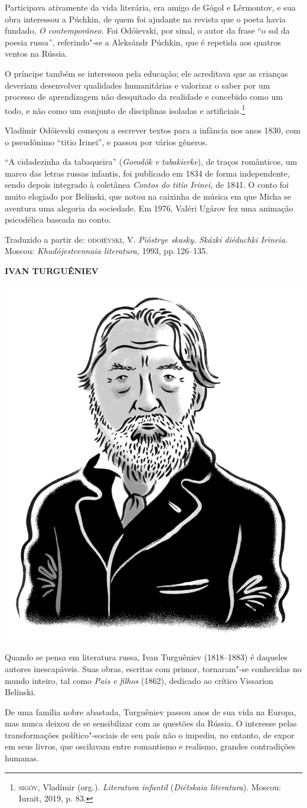 Participava ativamente da vida literária, era amigo de Gógol e
Lêrmontov, e sua obra interessou a Púchkin, de quem foi ajudante na
revista que o poeta havia fundado, \emph{O contemporâneo.} Foi
Odóievski, por sinal, o autor da frase ``o sol da poesia russa'',
referindo"-se a Aleksándr Púchkin, que é repetida aos quatros ventos na
Rússia.

O príncipe também se interessou pela educação; ele acreditava que as
crianças deveriam desenvolver qualidades humanitárias e valorizar o
saber por um processo de aprendizagem não desquitado da realidade e
concebido como um todo, e não como um conjunto de disciplinas isoladas e
artificiais.\footnote{\scriptsize\textsc{sigóv}, Vladímir (org.). \textit{Literatura infantil} (\textit{Diétskaia literatura}). Moscou: Iurait, 2019, p. 83.}

Vladímir Odóievski começou a escrever textos para a infância nos anos
1830, com o pseudônimo ``titio Irinei'', e passou por vários gêneros.

``A cidadezinha da tabaqueira'' (\emph{Gorodók v tabakierke}), de traços
românticos, um marco das letras russas infantis, foi publicado em 1834
de forma independente, sendo depois integrado à coletânea \emph{Contos
do titio Irinei,} de 1841. O conto foi muito elogiado por
Belínski, que notou na caixinha de música em que Micha se
aventura uma alegoria da sociedade. Em 1976, Valéri Ugárov fez uma
animação psicodélica baseada no conto. 

Traduzido a partir de: \textsc{odoiévski}, V. \emph{Pióstrye skasky. Skázki diéduchki Irineia.} Moscou:
\emph{Khudójestvennaia literatura,} 1993, pp.\,126--135.

\bigskip
\noindent\textbf{IVAN TURGUÊNIEV}\medskip

\noindent\includegraphics[width=.8in]{./imgs/autor3.jpg}

\noindent{}Quando se pensa em literatura russa, Ivan Turguêniev (1818--1883) é
daqueles autores inescapáveis. Suas obras, escritas com primor,
tornaram"-se conhecidas no mundo inteiro, tal como \emph{Pais e filhos}
(1862), dedicado ao crítico Vissarion Belínski.

De uma família nobre abastada, Turguêniev passou anos de sua vida na
Europa, mas nunca deixou de se sensibilizar com as questões da Rússia. O
interesse pelas transformações político"-sociais de seu país não o
impediu, no entanto, de expor em seus livros, que oscilavam entre
romantismo e realismo, grandes contradições humanas.

